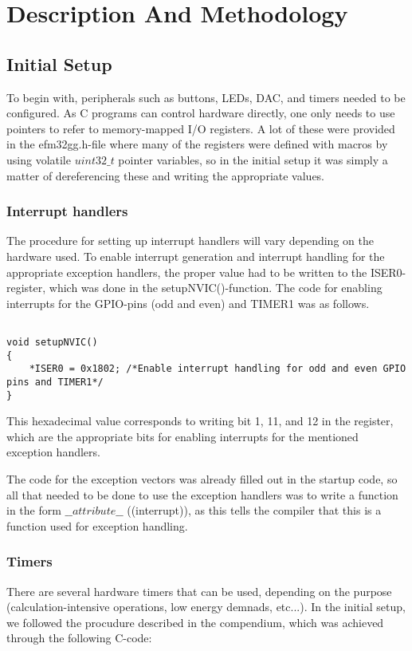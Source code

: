\section{Description And Methodology}


\subsection{Initial Setup}
To begin with, peripherals such as buttons, LEDs, DAC, and timers needed to be configured. As C programs can control hardware directly, one only needs to use pointers to refer to memory-mapped I/O registers. A lot of these were provided in the efm32gg.h-file where many of the registers were defined with macros by using volatile $uint32\_t$ pointer variables, so in the initial setup it was simply a matter of dereferencing these and writing the appropriate values.


\subsubsection{Interrupt handlers}
The procedure for setting up interrupt handlers will vary depending on the hardware used. To enable interrupt generation and interrupt handling for the appropriate exception handlers, the proper value had to be written to the ISER0-register, which was done in the setupNVIC()-function. The code for enabling interrupts for the GPIO-pins (odd and even) and TIMER1 was as follows.

\begin{lstlisting}

void setupNVIC()
{
 	*ISER0 = 0x1802; /*Enable interrupt handling for odd and even GPIO pins and TIMER1*/
}

\end{lstlisting} 
This hexadecimal value corresponds to writing bit 1, 11, and 12 in the register, which are the appropriate bits for enabling interrupts for the mentioned exception handlers.

The code for the exception vectors was already filled out in the startup code, so all that needed to be done to use the exception handlers was to write a function in the form $\_\_attribute\_\_$ ((interrupt)), as this tells the compiler that this is a function used for exception handling.


\subsubsection{Timers}
There are several hardware timers that can be used, depending on the purpose (calculation-intensive operations, low energy demnads, etc...). In the initial setup, we followed the procudure described in the compendium, which was achieved through the following C-code:

